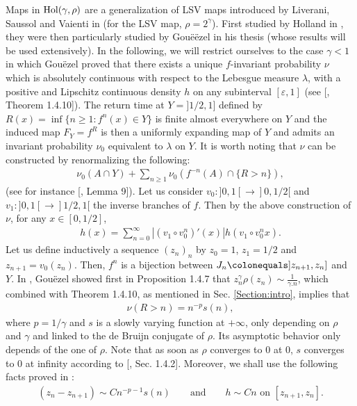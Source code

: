 \documentclass{ws-sd}
\newcommand{\abs}[1]{\left\lvert #1 \right\rvert}
\newcommand{\eqdef}{\colonequals}
\begin{document}
Maps in ${\rm Hol}(\gamma, \rho)$ are a generalization of LSV maps introduced by Liverani, Saussol and Vaienti in \cite{21} (for the LSV map, $\rho =2^\gamma$). First studied by Holland in \cite{18}, they were then particularly studied by Gou\"eëzel in his thesis \cite{13} (whose results will be used extensively).
In the following, we will restrict ourselves to the case $\gamma < 1$ in which Gou\"ezel proved that there exists a unique $f$-invariant probability $\nu$ which is absolutely continuous with respect to the Lebesgue measure $\lambda$, with a positive and Lipschitz continuous density $h$ on any subinterval $[\varepsilon, 1]$ (see [, Theorem 1.4.10]). The return time at $Y=]1/2,1]$ defined by $R(x) = \inf \{n \ge 1 : f^n(x) \in Y \}$ is finite almost everywhere on $Y$ and the induced map $F_Y = f^{R}$ is then a uniformly expanding map of $Y$ and admits an invariant probability $\nu_0$ equivalent to $\lambda$ on $Y$. It is worth noting that $\nu$ can be constructed by renormalizing the following:
\begin{align*}
    \nu_0(A\cap Y) + \sum_{n \ge 1} \nu_0 (f^{-n}(A) \cap \{ R > n \}),
\end{align*}
(see for instance [, Lemma 9]).
Let us consider $v_0 : ]0,1[ \to ]0,1/2[$ and $v_1 : ]0,1[ \to ]1/2,1[$ the inverse branches of $f$. Then by the above construction of $\nu$, for any $x \in [0,1/2]$,
\begin{align}\label{eq_densite_h}
    h(x) = \sum_{n=0}^{\infty} \abs{(v_1 \circ v_0^n)'(x)}h(v_1 \circ v_0^nx).
\end{align}
Let us define inductively a sequence $(z_n)_n$ by $z_0 = 1$, $z_1= 1/2$ and $z_{n+1} = v_0(z_n)$. Then, $f^n$ is a bijection between $J_n \eqdef  ]z_{n+1}, z_n]$ and $Y$. In \cite{13}, Gou\"ezel showed first in Proposition 1.4.7 that $z_n^{\gamma} \rho(z_n) \sim \frac{1}{\gamma . n}$, which combined with Theorem 1.4.10, as mentioned in Sec. \ref{Section:intro}, implies that
\begin{align}\label{queue_tps_retour}
    \nu(R > n) = n^{-p}s(n),
\end{align}
where $p = 1/\gamma$ and $s$ is a slowly varying function at $+\infty$, only depending on $\rho$ and $\gamma$ and linked to the de Bruijn conjugate of $\rho$. Its asymptotic behavior only depends of the one of $\rho$.
Note that as soon as $\rho$ converges to 0 at 0, $s$ converges to 0 at infinity according to [, Sec. 1.4.2].
Moreover, we shall use the following facts proved in \cite{21}:
\begin{align}
        \label{estim_zn}
    (z_n - z_{n+1}) \sim Cn^{-p-1}s(n)
    \qquad\text{and}\qquad
    h \sim Cn \text{ on } [z_{n+1},z_n].
\end{align}
\end{document}
